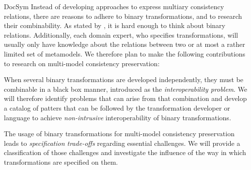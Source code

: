 \begin{copiedFrom}{DocSym}
Instead of developing approaches to express multiary consistency relations, there are reasons to adhere to binary transformations, and to research their combinability.
As stated by \textcite{stevens2017a}, %
it is hard enough to think about binary relations. %
Additionally, each domain expert, who specifies transformations, %
will usually only have knowledge about the relations between two or at most a rather limited set of metamodels. %
We therefore plan to make the following contributions to research on multi-model consistency preservation:
\begin{description}[leftmargin=\parindent]
    \item[Transformation interoperability.] %
        When several binary transformations are developed independently, they must be combinable in a black box manner, introduced as the \emph{interoperability problem}. We will therefore identify problems that can arise from that combination %
        and develop a catalog of patters that can be followed by the transformation developer or language to achieve \emph{non-intrusive} interoperability of binary transformations.
    \item[Decomposition of consistency relations.] 
        The usage of binary transformations for multi-model consistency preservation leads to \emph{specification trade-offs} regarding essential challenges. We will provide a classification of those challenges and investigate the influence of the way in which transformations are specified on them.

\end{description}
\end{copiedFrom}
